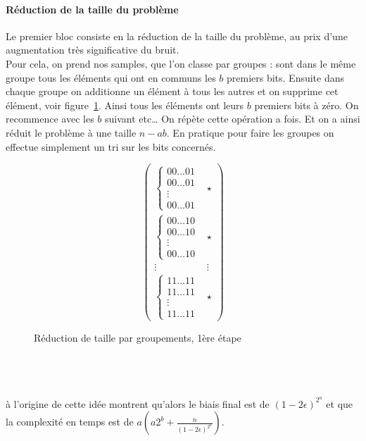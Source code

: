 \documentclass{article}		%
\theoremstyle{definition}
\theoremstyle{plain}
\theoremstyle{plain}
\theoremstyle{plain}
\theoremstyle{plain}
\theoremstyle{plain}
\begin{document}
\paragraph{Réduction de la taille du problème}
Le premier bloc consiste en la réduction de la taille du problème, au
prix d'une augmentation très significative du bruit.
\\
Pour cela, on prend nos samples, que l'on classe par groupes : sont dans
le même groupe tous les éléments qui ont en communs les $b$ premiers bits.
Ensuite dans chaque groupe on additionne un élément à tous les autres et
on supprime cet élément, voir figure~\ref{bbkw}. Ainsi tous les éléments ont leurs $b$ premiers
bits à zéro. On recommence avec les $b$ suivant etc\dots
On répète cette opération a fois. Et on a ainsi réduit le problème à une
taille $n-ab$. En pratique pour faire les groupes on effectue simplement
un tri sur les bits concernés.
\begin{figure}
$$\begin{pmatrix}
\begin{cases}00\dots01 \\00\dots01\\ \vdots\\00\dots01 \end{cases} & \star \\
\begin{cases} 00\dots10 \\00\dots10\\ \vdots\\00\dots10  \end{cases} & \star  \\
\vdots & \vdots \\
\begin{cases} 11\dots11 \\11\dots11\\ \vdots\\11\dots11  \end{cases} & \star 
\end{pmatrix}$$
\caption{Réduction de taille par groupements, 1ère étape}
\label{bbkw}
\end{figure}
\\
\\
\\
\cite{BKW} à l'origine de cette idée montrent qu'alors le biais final est
de $(1-2\epsilon)^{2^a}$ et que la complexité en temps est de
$a(a2^b+\frac {n} {(1-2\epsilon)^{2^a}})$.
\end{document}
